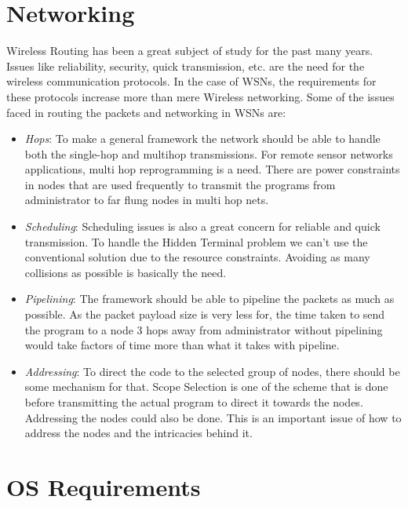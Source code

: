 \documentclass[twocolumn]{article}
\begin{document}
\section{Networking}

Wireless Routing has been a great subject of study for the past many years. Issues like reliability, security, quick transmission, etc. are the need for the wireless communication protocols. In the case of WSNs, the requirements for these protocols increase more than mere Wireless networking. Some of the issues faced in routing the packets and networking in WSNs are:
\begin{itemize}
\item \emph{Hops}: To make a general framework the network should be able to handle both the single-hop and multihop transmissions. For remote sensor networks applications, multi hop reprogramming is a need. There are power constraints in nodes that are used frequently to transmit the programs from administrator to far flung nodes in multi hop nets.

\item \emph{Scheduling}: Scheduling issues is also a great concern for reliable and quick transmission. To handle the Hidden Terminal problem we can’t use the conventional solution due to the resource constraints. Avoiding as many collisions as possible is basically the need.

\item \emph{Pipelining}: The framework should be able to pipeline the packets as much as possible. As the packet payload size is very less for, the time taken to send the program to a node 3 hops away from administrator without pipelining would take factors of time more than what it takes with pipeline.

\item \emph{Addressing}: To direct the code to the selected group of nodes, there should be some mechanism for that. Scope Selection\cite{Wang06reprogrammingwireless}\cite{Jeong04incrementalnetwork} is one of the scheme that is done before transmitting the actual program to direct it towards the nodes. Addressing the nodes could also be done. This is an important issue of how to address the nodes and the intricacies behind it.
\end{itemize}

\section{OS Requirements}
\end{document}
